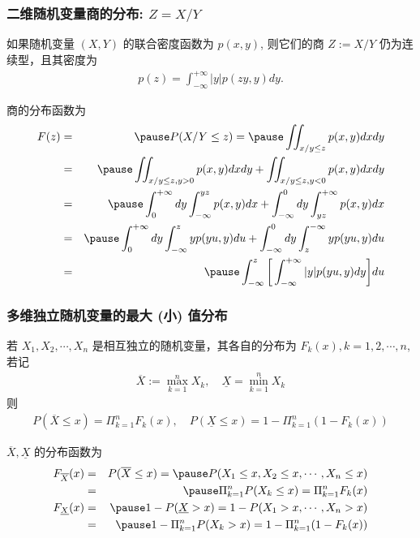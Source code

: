 \documentclass[Prob-All.tex]{subfiles}
\begin{document}
 \begin{frame}
 	\frametitle{二维随机变量商的分布: $Z=X/Y$}
 	\vspace{-0.3cm}
 	\begin{thm}[商的密度] 如果随机变量 $(X,Y)$ 的联合密度函数为 $p (x,y)$, 则它们的商 $Z:=X/Y$ 仍为连续型，且其密度为
 		\begin{eqnarray*}
 			p(z)=\int_{-\infty}^{+\infty} |y|p(zy,y)dy.
 		\end{eqnarray*}
 	\end{thm}
 	\pause \zheng 商的分布函数为
 	\vspace{-0.3cm}
 	\begin{eqnarray*}
 		F(z)&=&\pause P(X/Y\le z)=\pause \iint_{x/y\le z}p(x,y)dxdy\\
 		&=&\pause \iint_{x/y\le z, y>0}p(x,y)dxdy+\iint_{x/y\le z,y<0}p(x,y)dxdy\\
 		&=&\pause \int_0^{+\infty} dy\int_{-\infty}^{yz}p(x,y)dx+\int_{-\infty}^0dy\int_{yz}^{+\infty}p(x,y)dx\\
 		&=&\pause \int_0^{+\infty} dy\int_{-\infty}^{z}yp(yu,y)du+\int_{-\infty}^0dy\int_{z}^{-\infty}yp(yu,y)du\\
 		&=&\pause \int_{-\infty}^{z}\bigg[\int_{-\infty}^{+\infty}|y|p(yu,y)dy\bigg]du
 	\end{eqnarray*}

 \end{frame}
 \begin{frame}
 	\frametitle{多维独立随机变量的最大 (小) 值分布}
 	\begin{thm}
 		若 $X_1,X_2,\cdots,X_n$ 是相互独立的随机变量，其各自的分布为 $F_k (x), k=1,2,
 		\cdots, n$, 若记
 		\begin{eqnarray*}
 			\overline{X}:=\max_{k=1}^nX_k, \quad \underline{X}=\min_{k=1}^nX_k
 		\end{eqnarray*}
 		则
 		\begin{eqnarray*}
 			P(\overline{X}\le x)=\Pi_{k=1}^nF_k(x),\quad  P(\underline{X}\le x)=1-\Pi_{k=1}^n(1-F_k(x))
 		\end{eqnarray*}
 	\end{thm}
 	\pause \zheng $\overline{X},\underline{X}$ 的分布函数为
 	\begin{eqnarray*}
 		F_{\overline{X}}(x)&=&P(\overline{X}\le x)=\pause P(X_1\le x,X_2\le x,\cdots, X_n\le x)\\
 		&=&\pause  \Pi_{k=1}^nP(X_k\le x)=\Pi_{k=1}^nF_k(x)\\
 		F_{\underline{X}}(x)&=& \pause 1-P(\underline{X}>x)=1-P(X_1>x,\cdots, X_n>x)\\
 		&=&\pause 1-\Pi_{k=1}^nP(X_k>x)=1-\Pi_{k=1}^n(1-F_k(x))
 	\end{eqnarray*}

 \end{frame}
\end{document}
